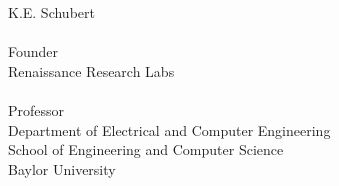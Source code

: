   K.E. Schubert \\
  \vspace{.1in} \\
  Founder \\
  Renaissance Research Labs \\
  \vspace{.1in} \\
  Professor \\
  Department of Electrical and Computer Engineering \\
  School of Engineering and Computer Science \\
  Baylor University 